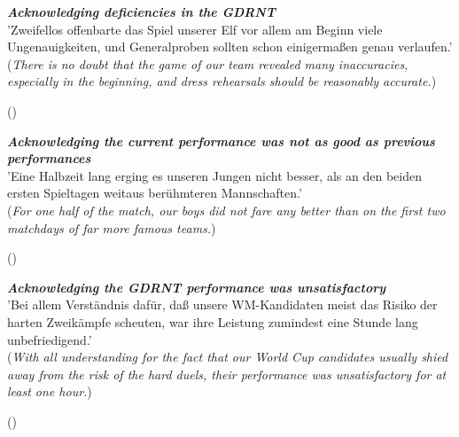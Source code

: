 \begin{displayquote}
\begin{small}
\textbf{\textit{Acknowledging deficiencies in the GDRNT}}\\
'Zweifellos offenbarte das Spiel unserer Elf vor allem am Beginn viele Ungenauigkeiten, und Generalproben sollten schon einigermaßen genau verlaufen.'\\
(\textit{There is no doubt that the game of our team revealed many inaccuracies, especially in the beginning, and dress rehearsals should be reasonably accurate.})\
\begin{flushright}\footnotesize (\cite{nd19740530})\end{flushright}
\end{small}
\end{displayquote}

\begin{displayquote}
\begin{small}
\textbf{\textit{Acknowledging the current performance was not as good as previous performances}}\\
'Eine Halbzeit lang erging es unseren Jungen nicht besser, als an den beiden ersten Spieltagen weitaus berühmteren Mannschaften.'\\
(\textit{For one half of the match, our boys did not fare any better than on the first two matchdays of far more famous teams.})\
\begin{flushright}\footnotesize (\cite{nd19740615})\end{flushright}
\end{small}
\end{displayquote}

\begin{displayquote}
\begin{small}
\textbf{\textit{Acknowledging the GDRNT performance was unsatisfactory}}\\
'Bei allem Verständnis dafür, daß unsere WM-Kandidaten meist das Risiko der harten Zweikämpfe scheuten, war ihre Leistung zumindest eine Stunde lang unbefriedigend.'\\
(\textit{With all understanding for the fact that our World Cup candidates usually shied away from the risk of the hard duels, their performance was unsatisfactory for at least one hour.})\
\begin{flushright}\footnotesize (\cite{nd19740524})\end{flushright}
\end{small}
\end{displayquote}

